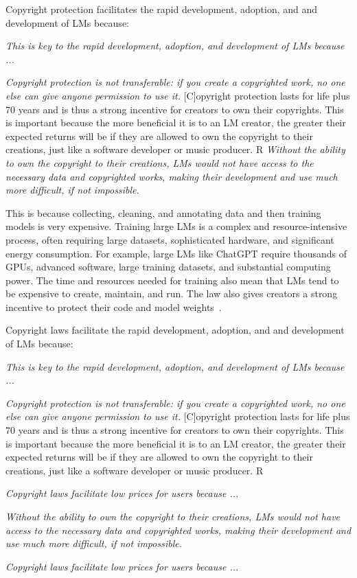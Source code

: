 {{Copyright protection facilitates the rapid development, adoption, and and development of LMs because:
\begin{myquotation}
    \emph{This is key to the rapid development, adoption, and development of LMs because ...}
    \item \emph{Copyright protection is not transferable: if you create a copyrighted work, no one else can give anyone permission to use it.} [C]opyright protection lasts for life plus 70 years and is thus a strong incentive for creators to own their copyrights. This is important because the more beneficial it is to an LM creator, the greater their expected returns will be if they are allowed to own the copyright to their creations, just like a software developer or music producer. R
\emph{Without the ability to own the copyright to their creations, LMs would not have access to the necessary data and copyrighted works, making their development and use much more difficult, if not impossible.}
\end{myquotation}

This is because collecting, cleaning, and annotating data and then training models is very expensive.
Training large LMs is a complex and resource-intensive process, often requiring large datasets, sophisticated hardware, and significant energy consumption.
For example, large LMs like ChatGPT require thousands of GPUs, advanced software, large training datasets, and substantial computing power.
The time and resources needed for training also mean that LMs tend to be expensive to create, maintain, and run.
The law also gives creators a strong incentive to protect their code and model weights~\citep{henderson2023foundation, lemley2020fair}.

Copyright laws facilitate the rapid development, adoption, and and development of LMs because:
\begin{myquotation}
    \emph{This is key to the rapid development, adoption, and development of LMs because ...}
    \item \emph{Copyright protection is not transferable: if you create a copyrighted work, no one else can give anyone permission to use it.} [C]opyright protection lasts for life plus 70 years and is thus a strong incentive for creators to own their copyrights. This is important because the more beneficial it is to an LM creator, the greater their expected returns will be if they are allowed to own the copyright to their creations, just like a software developer or music producer. R
    \item \emph{Copyright laws facilitate low prices for users because ...}
    \item \emph{Without the ability to own the copyright to their creations, LMs would not have access to the necessary data and copyrighted works, making their development and use much more difficult, if not impossible.}
    \item \emph{Copyright laws facilitate low prices for users because ...}
\end{myquotation}

}}
